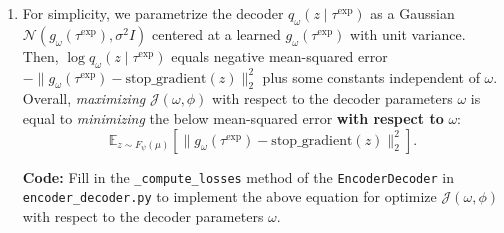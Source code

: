 \documentclass[12pt]{article}
\begin{document}
\begin{enumerate}
    \item
        For simplicity, we parametrize the decoder $q_\omega(z \mid \tau^\text{exp})$ as a Gaussian $\mathcal{N}(g_{\omega}(\tau^\text{exp}), \sigma^2I)$ centered at a learned $g_\omega(\tau^\text{exp})$ with unit variance.
        Then, $\log q_\omega(z \mid \tau^\text{exp})$ equals negative mean-squared error $-\lVert g_\omega(\tau^\text{exp}) - \text{stop\_gradient}(z) \rVert^2_2$ plus some constants independent of $\omega$.
        Overall, \emph{maximizing} $\mathcal{J}(\omega, \phi)$ with respect to the decoder parameters $\omega$ is equal to \emph{minimizing} the below mean-squared error \textbf{with respect to} $\omega$:
        \begin{equation*}
            \mathbb{E}_{z \sim F_\psi(\mu)} \left[ \lVert g_\omega(\tau^\text{exp}) - \text{stop\_gradient}(z) \rVert^2_2 \right].
        \end{equation*}
        
        \textbf{Code:} Fill in the \texttt{\_compute\_losses} method of the \texttt{EncoderDecoder} in \texttt{encoder\_decoder.py} to implement the above equation for optimize $\mathcal{J}(\omega, \phi)$ with respect to the decoder parameters $\omega$.


\end{enumerate}
\end{document}
